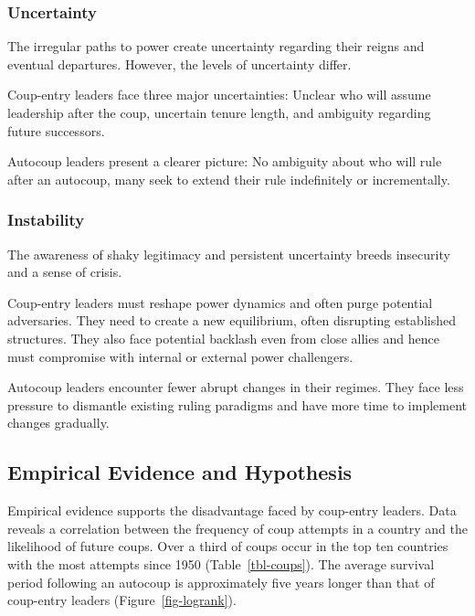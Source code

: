 \documentclass[
  12pt,
]{report}
\begin{document}
\subsubsection*{Uncertainty}\label{uncertainty}

The irregular paths to power create uncertainty regarding their reigns
and eventual departures. However, the levels of uncertainty differ.

Coup-entry leaders face three major uncertainties: Unclear who will
assume leadership after the coup, uncertain tenure length, and ambiguity
regarding future successors.

Autocoup leaders present a clearer picture: No ambiguity about who will
rule after an autocoup, many seek to extend their rule indefinitely or
incrementally.

\subsubsection*{Instability}\label{instability}

The awareness of shaky legitimacy and persistent uncertainty breeds
insecurity and a sense of crisis.

Coup-entry leaders must reshape power dynamics and often purge potential
adversaries. They need to create a new equilibrium, often disrupting
established structures. They also face potential backlash even from
close allies and hence must compromise with internal or external power
challengers.

Autocoup leaders encounter fewer abrupt changes in their regimes. They
face less pressure to dismantle existing ruling paradigms and have more
time to implement changes gradually.

\subsection{Empirical Evidence and
Hypothesis}\label{empirical-evidence-and-hypothesis}

Empirical evidence supports the disadvantage faced by coup-entry
leaders. Data reveals a correlation between the frequency of coup
attempts in a country and the likelihood of future coups. Over a third
of coups occur in the top ten countries with the most attempts since
1950 (Table~\ref{tbl-coups}). The average survival period following an
autocoup is approximately five years longer than that of coup-entry
leaders (Figure~\ref{fig-logrank}).
\end{document}
